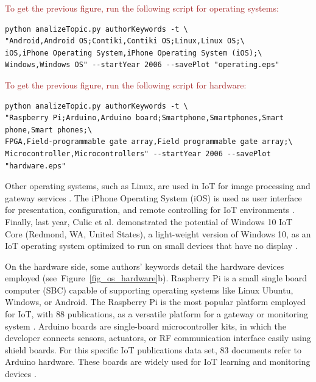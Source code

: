\documentclass[symmetry,article,accept,moreauthors,pdftex10pt,a4paper]{mdpi}
\begin{document}
\noindent
\textcolor{brown}{To get the previous figure, run the following script for operating systems:}\\
\begin{verbatim}
python analizeTopic.py authorKeywords -t \
"Android,Android OS;Contiki,Contiki OS;Linux,Linux OS;\
iOS,iPhone Operating System,iPhone Operating System (iOS);\
Windows,Windows OS" --startYear 2006 --savePlot "operating.eps"
\end{verbatim}

\noindent
\textcolor{brown}{To get the previous figure, run the following script for hardware:}\\
\begin{verbatim}
python analizeTopic.py authorKeywords -t \
"Raspberry Pi;Arduino,Arduino board;Smartphone,Smartphones,Smart phone,Smart phones;\
FPGA,Field-programmable gate array,Field programmable gate array;\
Microcontroller,Microcontrollers" --startYear 2006 --savePlot "hardware.eps"
\end{verbatim}

Other operating systems, such as Linux, are used in IoT for image processing \cite{Dinesh2016} and gateway services \cite{Xu20164713}. The iPhone Operating System (iOS) is used as user interface for presentation, configuration, and remote controlling for IoT environments \cite{Kovalcik2016}. Finally, last year, Culic et al. demonstrated the potential of Windows 10 IoT Core (Redmond, WA, United States), a light-weight version of Windows 10, as an IoT operating system optimized to run on small devices that have no display \cite{7753246}.

On the hardware side, some authors' keywords detail the hardware devices employed (see~Figure~\ref{fig_os_hardware}b). Raspberry Pi is a small single board computer (SBC) capable of supporting operating systems like Linux Ubuntu, Windows, or Android. The Raspberry Pi is the most popular platform employed for IoT, with 88 publications, as a versatile platform for a gateway \cite{Suresh201517163,Kim20171533,Gloria2017568} or monitoring system \cite{7380571,Balasubramaniyan2016}. Arduino boards are single-board microcontroller kits, in which the developer connects sensors, actuators, or RF communication interface easily using shield boards. For this specific IoT publications data set, 83 documents refer to Arduino hardware. These boards are widely used for IoT learning \cite{Bogdanovic2014259,Raikar201715,Kovalcik2016} and monitoring devices \cite{Amin201543663,Fuertes201658,Ashwini20164311}. 
\end{document}
